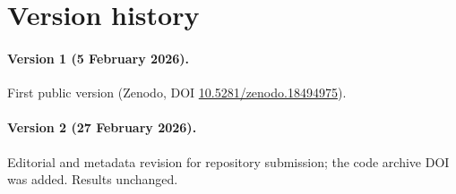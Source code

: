 \documentclass[11pt]{article}
\begin{document}
 \section{Version history}
\label{app:versions}

\paragraph{Version 1 (5 February 2026).}
First public version (Zenodo, DOI \href{https://doi.org/10.5281/zenodo.18494975}{10.5281/zenodo.18494975}).

\paragraph{Version 2 (27 February 2026).}
Editorial and metadata revision for repository submission; the code archive DOI was added. Results unchanged.
\end{document}
